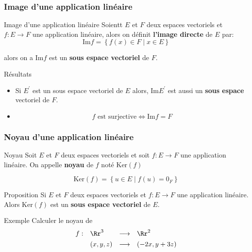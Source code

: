 \documentclass[dvipsnames]{beamer}
\begin{document}
\begin{frame}[t]
  \frametitle{Image d'une application linéaire}
 \begin{block}{Image d'une application linéaire}
   \small
   Soientt $E$ et $F$ deux espaces vectoriels et $f: E\longrightarrow F$ une
   application linéaire, alors on définit \textbf{\alert{l'image directe}} de
   $E$ par:
   \begin{equation*}
     \text{Im}f = \left\{ f(x) \in F\;|\; x \in E\right\}
   \end{equation*}

   alors on a $\text{Im}f$ est un \textbf{sous espace vectoriel}  de $F$.
 \end{block} 


 \begin{block}{Résultats}
   \small
   \begin{itemize}
     \item Si $E^{'}$ est un sous espace vectoriel de $E$ alors, $\text{Im}E^{'}$
       est aussi un \textbf{\alert{sous espace}} vectoriel de $F$. \\[8pt]

      \item 
        \begin{equation*}
          f  \text{ est surjective} \iff \text{Im}f = F
        \end{equation*}
   \end{itemize}
 \end{block}
\end{frame}
\begin{frame}[t]
  \frametitle{Noyau d'une application linéaire}
  
  \begin{block}{Noyau}
    \small
    Soit $E$ et $F$ deux espaces vectoriels et soit $f:E\longrightarrow F$ une
    application linéaire. On appelle \textbf{\alert{noyau}}  de $f$ noté
    $\text{Ker}(f)$ 

\begin{equation}
  \text{Ker}(f) =\left\{ u \in E\;|\; f(u) = 0_F \right\} 
\end{equation}

  \end{block}
\pause
  \begin{block}{Proposition}
    \small
    Si $E$ et $F$ deux espaces vectoriels et $f: E\longrightarrow F$ une
    application linéaire. Alors $\text{Ker}(f)$ est un \textbf{\alert{sous
    espace vectoriel}}  de $E$.
  \end{block}
  \pause
  \begin{block}{Exemple}
    \small
    Calculer le noyau de 
    \begin{equation*}
      \begin{array}{llll}
        f: &\Rr^3 &\longrightarrow & \Rr^2\\[4pt]
        &   (x,y,z)&\longrightarrow & (-2x,y + 3z)
      \end{array}
    \end{equation*}
  \end{block}
\end{frame}
\end{document}
